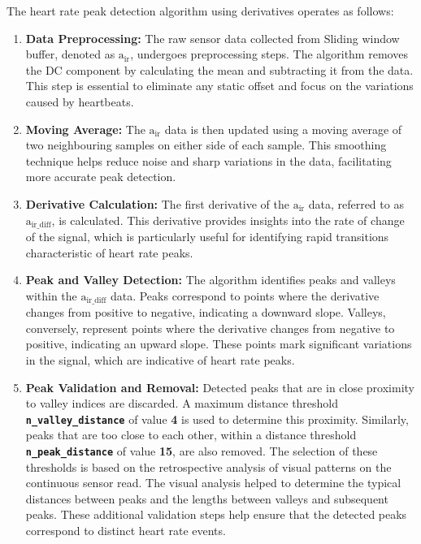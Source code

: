 \noindent The heart rate peak detection algorithm using derivatives operates as follows:

\begin{enumerate}
    \item \textbf{Data Preprocessing:} The raw sensor data collected from Sliding window buffer, denoted as \texttt{\(\text{a}_\text{ir}\)}, undergoes preprocessing steps. The algorithm removes the DC component by calculating the mean and subtracting it from the data. This step is essential to eliminate any static offset and focus on the variations caused by heartbeats.
    
    \item \textbf{Moving Average:} The \texttt{\(\text{a}_\text{ir}\)} data is then updated using a moving average of two neighbouring samples on either side of each sample. This smoothing technique helps reduce noise and sharp variations in the data, facilitating more accurate peak detection.
    
    \item \textbf{Derivative Calculation:} The first derivative of the \texttt{\(\text{a}_\text{ir}\)} data, referred to as \texttt{\(\text{a}_\text{ir\_diff}\)}, is calculated. This derivative provides insights into the rate of change of the signal, which is particularly useful for identifying rapid transitions characteristic of heart rate peaks.
    
    \item \textbf{Peak and Valley Detection:} The algorithm identifies peaks and valleys within the \texttt{\(\text{a}_\text{ir\_diff}\)} data. Peaks correspond to points where the derivative changes from positive to negative, indicating a downward slope. Valleys, conversely, represent points where the derivative changes from negative to positive, indicating an upward slope. These points mark significant variations in the signal, which are indicative of heart rate peaks.
    
    \item \textbf{Peak Validation and Removal:} Detected peaks that are in close proximity to valley indices are discarded. A maximum distance threshold \textbf{\texttt{n\_valley\_distance}} of value \textbf{4} is used to determine this proximity. Similarly, peaks that are too close to each other, within a distance threshold \textbf{\texttt{n\_peak\_distance}} of value \textbf{15}, are also removed. The selection of these thresholds is based on the retrospective analysis of visual patterns on the continuous sensor read. The visual analysis helped to determine the typical distances between peaks and the lengths between valleys and subsequent peaks. These additional validation steps help ensure that the detected peaks correspond to distinct heart rate events.
    

\end{enumerate}
